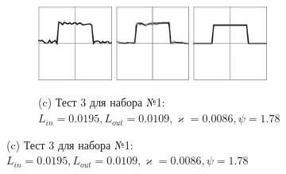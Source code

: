 \documentclass[12pt, a4paper]{article}
\renewcommand{\kappa}{\varkappa}
\begin{document}
\begin{figure}[!hp]
	\vspace{1em}
	\begin{subfigure}{\textwidth}
		\centering
		\includegraphics[width=0.27\textwidth]{res_n1_5}
		\hfill
		\includegraphics[width=0.27\textwidth]{res_n2_6}
		\hfill
		\includegraphics[width=0.27\textwidth]{3}
		\caption*{\small (c) Тест 3 для набора №1: $L_{in} = 0.0195, L_{out} = 0.0109, \kappa = 0.0086, \psi = 1.78$}
	\end{subfigure}
\end{figure}

\newpage
\end{document}
